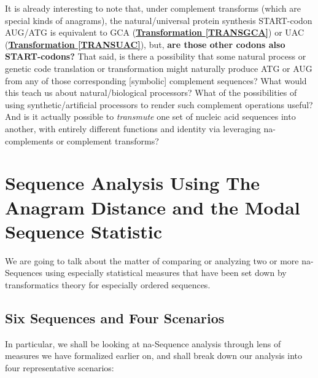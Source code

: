 \documentclass[a4paper, 18pt]{book} %
\begin{document}
It is already interesting to note that, under complement transforms (which are special kinds of anagrams), the natural/universal protein synthesis START-codon AUG/ATG is equivalent to GCA (\textbf{\hyperref[TRANSGCA]{Transformation \ref{TRANSGCA}}}) or UAC (\textbf{\hyperref[TRANSUAC]{Transformation \ref{TRANSUAC}}}), but, \textbf{are those other codons also START-codons?} That said, is there a possibility that some natural process or genetic code translation or transformation might naturally produce ATG or AUG from any of those corresponding [symbolic] complement sequences? What would this teach us about natural/biological processors? What of the possibilities of using synthetic/artificial processors to render such complement operations useful? And is it actually possible to \textit{transmute} one set of nucleic acid sequences into another, with entirely different functions and identity via leveraging na-complements or complement transforms?




\chapter{Sequence Analysis Using The Anagram Distance and the Modal Sequence Statistic}
\label{SEC4A}



We are going to talk about the matter of comparing or analyzing two or more na-Sequences using especially statistical measures that have been set down by transformatics theory for especially ordered sequences. 

\section{Six Sequences and Four Scenarios}
\label{SEC4ASEQ}

In particular, we shall be looking at na-Sequence analysis through lens of measures we have formalized earlier on, and shall break down our analysis into four representative scenarios:
\end{document}
